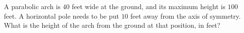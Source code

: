 A parabolic arch is $40$ feet wide at the ground, and its maximum height is $100$ feet. A horizontal pole needs to be put $10$ feet away from the axis of symmetry. What is the height of the arch from the ground at that position, in feet?
